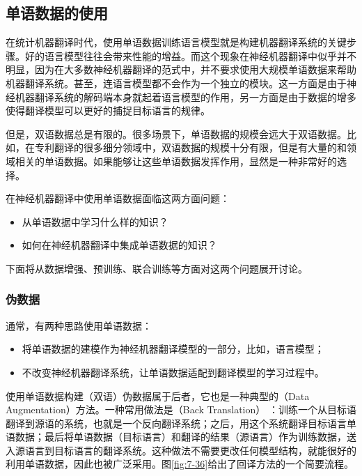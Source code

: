 \subsection{单语数据的使用}\label{subsection-7.2.6}

\parinterval 在统计机器翻译时代，使用单语数据训练语言模型就是构建机器翻译系统的关键步骤。好的语言模型往往会带来性能的增益。而这个现象在神经机器翻译中似乎并不明显，因为在大多数神经机器翻译的范式中，并不要求使用大规模单语数据来帮助机器翻译系统。甚至，连语言模型都不会作为一个独立的模块。这一方面是由于神经机器翻译系统的解码端本身就起着语言模型的作用，另一方面是由于数据的增多使得翻译模型可以更好的捕捉目标语言的规律。

\parinterval 但是，双语数据总是有限的。很多场景下，单语数据的规模会远大于双语数据。比如，在专利翻译的很多细分领域中，双语数据的规模十分有限，但是有大量的和领域相关的单语数据。如果能够让这些单语数据发挥作用，显然是一种非常好的选择。

\parinterval 在神经机器翻译中使用单语数据面临这两方面问题：

\begin{itemize}
\vspace{0.5em}
\item 从单语数据中学习什么样的知识？
\vspace{0.5em}
\item 如何在神经机器翻译中集成单语数据的知识？
\vspace{0.5em}
\end{itemize}

\parinterval 下面将从数据增强、预训练、联合训练等方面对这两个问题展开讨论。

\subsubsection{伪数据}

\parinterval 通常，有两种思路使用单语数据：

\begin{itemize}
\vspace{0.5em}
\item 将单语数据的建模作为神经机器翻译模型的一部分，比如，语言模型；
\vspace{0.5em}
\item 不改变神经机器翻译系统，让单语数据适配到翻译模型的学习过程中。
\vspace{0.5em}
\end{itemize}

\parinterval 使用单语数据构建（双语）伪数据属于后者，它也是一种典型的{\small{}}（Data Augmentation）方法。一种常用做法是{\small{}}（Back Translation） \cite{DBLP:conf/acl/SennrichHB16,DBLP:conf/emnlp/EdunovOAG18}：训练一个从目标语翻译到源语的系统，也就是一个反向翻译系统；之后，用这个系统翻译目标语言单语数据；最后将单语数据（目标语言）和翻译的结果（源语言）作为训练数据，送入源语言到目标语言的翻译系统。这种做法不需要更改任何模型结构，就能很好的利用单语数据，因此也被广泛采用。图\ref{fig:7-36}给出了回译方法的一个简要流程。

